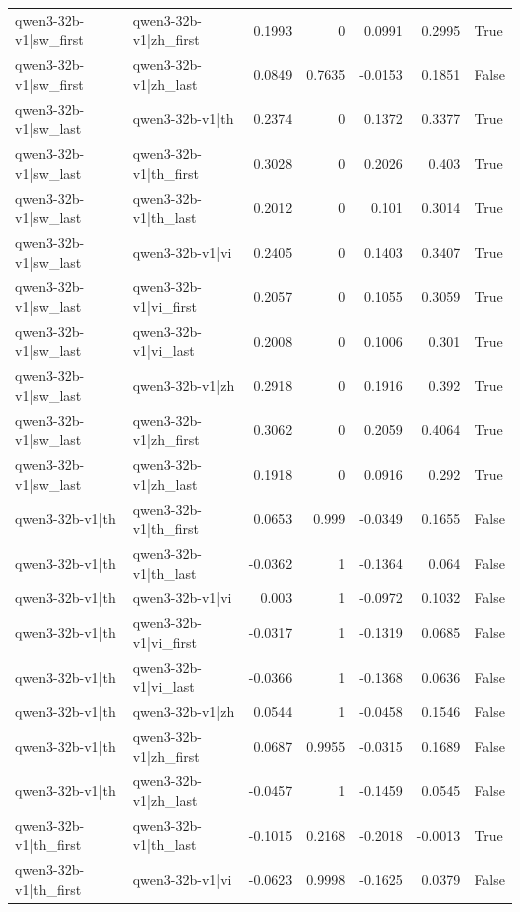 \begin{table}
\begin{tabular}{l l r r r r l}
qwen3-32b-v1|sw_first & qwen3-32b-v1|zh_first & 0.1993 & 0 & 0.0991 & 0.2995 & True \\
qwen3-32b-v1|sw_first & qwen3-32b-v1|zh_last & 0.0849 & 0.7635 & -0.0153 & 0.1851 & False \\
qwen3-32b-v1|sw_last & qwen3-32b-v1|th & 0.2374 & 0 & 0.1372 & 0.3377 & True \\
qwen3-32b-v1|sw_last & qwen3-32b-v1|th_first & 0.3028 & 0 & 0.2026 & 0.403 & True \\
qwen3-32b-v1|sw_last & qwen3-32b-v1|th_last & 0.2012 & 0 & 0.101 & 0.3014 & True \\
qwen3-32b-v1|sw_last & qwen3-32b-v1|vi & 0.2405 & 0 & 0.1403 & 0.3407 & True \\
qwen3-32b-v1|sw_last & qwen3-32b-v1|vi_first & 0.2057 & 0 & 0.1055 & 0.3059 & True \\
qwen3-32b-v1|sw_last & qwen3-32b-v1|vi_last & 0.2008 & 0 & 0.1006 & 0.301 & True \\
qwen3-32b-v1|sw_last & qwen3-32b-v1|zh & 0.2918 & 0 & 0.1916 & 0.392 & True \\
qwen3-32b-v1|sw_last & qwen3-32b-v1|zh_first & 0.3062 & 0 & 0.2059 & 0.4064 & True \\
qwen3-32b-v1|sw_last & qwen3-32b-v1|zh_last & 0.1918 & 0 & 0.0916 & 0.292 & True \\
qwen3-32b-v1|th & qwen3-32b-v1|th_first & 0.0653 & 0.999 & -0.0349 & 0.1655 & False \\
qwen3-32b-v1|th & qwen3-32b-v1|th_last & -0.0362 & 1 & -0.1364 & 0.064 & False \\
qwen3-32b-v1|th & qwen3-32b-v1|vi & 0.003 & 1 & -0.0972 & 0.1032 & False \\
qwen3-32b-v1|th & qwen3-32b-v1|vi_first & -0.0317 & 1 & -0.1319 & 0.0685 & False \\
qwen3-32b-v1|th & qwen3-32b-v1|vi_last & -0.0366 & 1 & -0.1368 & 0.0636 & False \\
qwen3-32b-v1|th & qwen3-32b-v1|zh & 0.0544 & 1 & -0.0458 & 0.1546 & False \\
qwen3-32b-v1|th & qwen3-32b-v1|zh_first & 0.0687 & 0.9955 & -0.0315 & 0.1689 & False \\
qwen3-32b-v1|th & qwen3-32b-v1|zh_last & -0.0457 & 1 & -0.1459 & 0.0545 & False \\
qwen3-32b-v1|th_first & qwen3-32b-v1|th_last & -0.1015 & 0.2168 & -0.2018 & -0.0013 & True \\
qwen3-32b-v1|th_first & qwen3-32b-v1|vi & -0.0623 & 0.9998 & -0.1625 & 0.0379 & False \\

\end{tabular}
\end{table}
